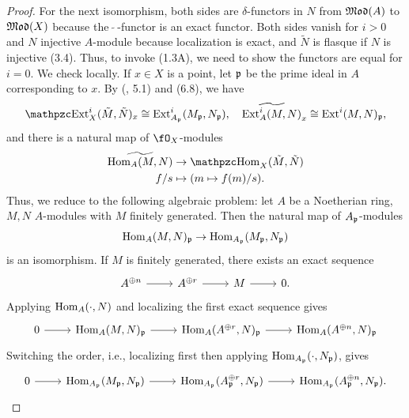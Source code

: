 \documentclass[a4paper]{article}
\begin{document}
\begin{enumerate} [label=\textbf{\arabic*.}, leftmargin=0em]
\begin{proof}
          For the next isomorphism, both sides are $\delta$-functors in $N$ from $\mathfrak{Mod}(A)$ to $\mathfrak{Mod}(X)$ because the $~\tilde{}~$-functor is an exact functor.
          Both sides vanish for $i > 0$ and $N$ injective $A$-module because localization is exact, and $\tilde{N}$ is flasque if $N$ is injective (3.4).
          Thus, to invoke (1.3A), we need to show the functors are equal for $i = 0$.
          We check locally.
          If $x \in X$ is a point, let $\mathfrak{p}$ be the prime ideal in $A$ corresponding to $x$.
          By (, 5.1) and (6.8), we have
          \begin{equation*}
            \rExt_X^i(\tilde{M}, \tilde{N})_x \cong \Ext^i_{A_\goth{p}}(M_\goth{p}, N_\goth{p}), \quad \widetilde{\Ext_A^i(M, N)}_x \cong \Ext^i(M, N)_\goth{p},
          \end{equation*}
          and there is a natural map of $\fO_X$-modules
          \begin{align*}
            \widetilde{\Hom_A(M, N)} & \to \rHom_X(\tilde{M}, \tilde{N}) \\
            f / s                    & \mapsto (m \mapsto f(m) / s).
          \end{align*}
          Thus, we reduce to the following algebraic problem: let $A$ be a Noetherian ring, $M, N$ $A$-modules with $M$ finitely generated.
          Then the natural map of $A_{\mathfrak{p}}$-modules
          \begin{equation*}
            \operatorname{Hom}_A(M, N)_{\mathfrak{p}} \to \operatorname{Hom}_{A_{\mathfrak{p}}}(M_{\mathfrak{p}}, N_{\mathfrak{p}})
          \end{equation*}
          is an isomorphism.
          If $M$ is finitely generated, there exists an exact sequence
          \[ \begin{tikzcd}
              A^{\oplus n} \arrow[r] & A^{\oplus r} \arrow[r] & M \arrow[r] & 0.
            \end{tikzcd} \]
          Applying $\operatorname{Hom}_A(\cdot, N)$ and localizing the first exact sequence gives
          \[ \begin{tikzcd}
              0 \arrow[r] & {\Hom_A(M, N)_\goth{p}} \arrow[r] & {\Hom_A(A^{\oplus r}, N)_\goth{p}} \arrow[r] & {\Hom_A(A^{\oplus n}, N)_\goth{p}}
            \end{tikzcd} \]
          Switching the order, i.e., localizing first then applying $\operatorname{Hom}_{A_{\mathfrak{p}}}(\cdot, N_{\mathfrak{p}})$, gives
          \[ \begin{tikzcd}
              0 \arrow[r] & {\Hom_{A_\goth{p}}(M_\goth{p}, N_\goth{p})} \arrow[r] & {\Hom_{A_\goth{p}}(A_\goth{p}^{\oplus r}, N_\goth{p})} \arrow[r] & {\Hom_{A_\goth{p}}(A^{\oplus n}_\goth{p}, N_\goth{p})}.

\end{tikzcd}\]
\end{proof}
\end{enumerate}
\end{document}
